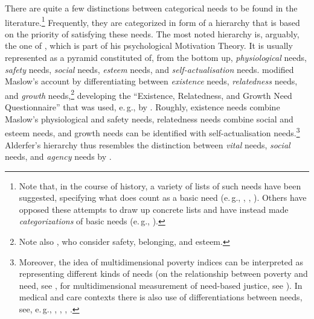 \documentclass[egregdoesnotlikesansseriftitles]{scrartcl}
\begin{document}
There are quite a few distinctions between categorical needs to be found in the literature.\footnote{Note that, in the course of history, a variety of lists of such needs have been suggested, specifying what does count as a basic need (e.\,g., \citealt{doyal_theory_1991}, \citealt{braybrooke_meeting_1987}, \citealt{nussbaum_aristotelian_1990}).
Others have opposed these attempts to draw up concrete lists and have instead made \textit{categorizations} of basic needs (e.\,g., \citealt{hamilton_political_2003}).}
Frequently, they are categorized in form of a hierarchy that is based on the priority of satisfying these needs.
The most noted hierarchy is, arguably, the one of \cite{maslow_theory_1943}, which is part of his psychological Motivation Theory.
It is usually represented as a pyramid constituted of, from the bottom up, \textit{physiological} needs, \textit{safety} needs, \textit{social} needs, \textit{esteem} needs, and \textit{self-actualisation} needs.
\cite{alderfer_empirical_1969,alderfer_existence_1972} modified Maslow's account by differentiating between \textit{existence} needs, \textit{relatedness} needs, and \textit{growth} needs,\footnote{Note also \cite{williams_multi-dimensional_1989}, who consider safety, belonging, and esteem.} developing the ``Existence, Relatedness, and Growth Need Questionnaire'' that was used, e.\,g., by \cite{rauschenberger_test_1980}.
Roughly, existence needs combine Maslow's physiological and safety needs, relatedness needs combine social and esteem needs, and growth needs can be identified with self-actualisation needs.\footnote{Moreover, the idea of multidimensional poverty indices can be interpreted as representing different kinds of needs (on the relationship between poverty and need, see \citealt{carthaigh_need_2014}, for multidimensional measurement of need-based justice, see \citealt{bauer_sated_2018,bauer_sated_2022}). In medical and care contexts there is also use of differentiations between needs, see, e.\,g., \cite{hornquist_concept_1982}, \cite{cleary_patient_2006}, \cite{vlachantoni_measuring_2011}, \cite{glorney_domains_2010}.}
Alderfer's hierarchy thus resembles the distinction between \textit{vital} needs, \textit{social} needs, and \textit{agency} needs by \cite{hamilton_political_2003,de_bruin_human_2009}.
\end{document}
